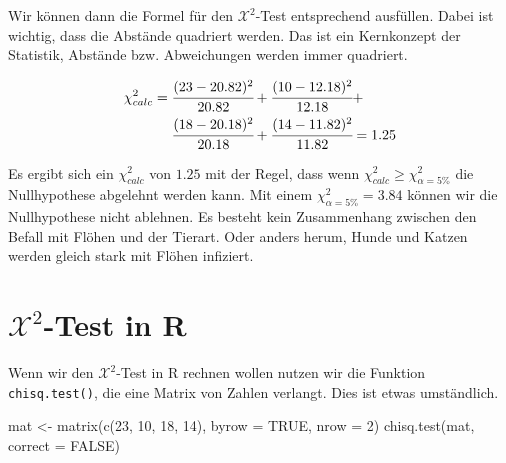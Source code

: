 \documentclass[
  letterpaper,
]{scrbook}
\newenvironment{Shaded}{\begin{snugshade}}{\end{snugshade}}
\newcommand{\AttributeTok}[1]{\textcolor[rgb]{0.40,0.45,0.13}{#1}}
\newcommand{\ConstantTok}[1]{\textcolor[rgb]{0.56,0.35,0.01}{#1}}
\newcommand{\DecValTok}[1]{\textcolor[rgb]{0.68,0.00,0.00}{#1}}
\newcommand{\FunctionTok}[1]{\textcolor[rgb]{0.28,0.35,0.67}{#1}}
\newcommand{\NormalTok}[1]{\textcolor[rgb]{0.00,0.23,0.31}{#1}}
\newcommand{\OtherTok}[1]{\textcolor[rgb]{0.00,0.23,0.31}{#1}}
\begin{document}
Wir können dann die Formel für den \(\mathcal{X}^2\)-Test entsprechend
ausfüllen. Dabei ist wichtig, dass die Abstände quadriert werden. Das
ist ein Kernkonzept der Statistik, Abstände bzw. Abweichungen werden
immer quadriert.

\begin{align*} 
\chi^2_{calc} &= \cfrac{(23 - 20.82)^2}{20.82} + \cfrac{(10 - 12.18)^2}{12.18} + \\
&\phantom{=}\;\; \cfrac{(18 - 20.18)^2}{20.18} + \cfrac{(14 - 11.82)^2}{11.82} = 1.25
\end{align*}

Es ergibt sich ein \(\chi^2_{calc}\) von \(1.25\) mit der Regel, dass
wenn \(\chi^2_{calc} \geq \chi^2_{\alpha=5\%}\) die Nullhypothese
abgelehnt werden kann. Mit einem \(\chi^2_{\alpha=5\%} = 3.84\) können
wir die Nullhypothese nicht ablehnen. Es besteht kein Zusammenhang
zwischen den Befall mit Flöhen und der Tierart. Oder anders herum, Hunde
und Katzen werden gleich stark mit Flöhen infiziert.

\hypertarget{mathcalx2-test-in-r}{%
\section{\texorpdfstring{\(\mathcal{X}^2\)-Test in
R}{\textbackslash mathcal\{X\}\^{}2-Test in R}}\label{mathcalx2-test-in-r}}

{}

Wenn wir den \(\mathcal{X}^2\)-Test in R rechnen wollen nutzen wir die
Funktion \texttt{chisq.test()}, die eine Matrix von Zahlen verlangt.
Dies ist etwas umständlich.

\begin{Shaded}
\begin{Highlighting}[]
\NormalTok{mat }\OtherTok{\textless{}{-}} \FunctionTok{matrix}\NormalTok{(}\FunctionTok{c}\NormalTok{(}\DecValTok{23}\NormalTok{, }\DecValTok{10}\NormalTok{, }\DecValTok{18}\NormalTok{, }\DecValTok{14}\NormalTok{), }
              \AttributeTok{byrow =} \ConstantTok{TRUE}\NormalTok{, }\AttributeTok{nrow =} \DecValTok{2}\NormalTok{)}
\FunctionTok{chisq.test}\NormalTok{(mat, }\AttributeTok{correct =} \ConstantTok{FALSE}\NormalTok{)}
\end{Highlighting}
\end{Shaded}
\end{document}

